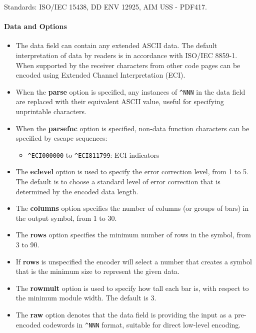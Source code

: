Standards: ISO/IEC 15438, DD ENV 12925, AIM USS - PDF417.

\hypertarget{data-and-options-15}{%
\paragraph{Data and Options}\label{data-and-options-15}}

\begin{itemize}
\tightlist
\item
  The data field can contain any extended ASCII data. The default
  interpretation of data by readers is in accordance with ISO/IEC
  8859-1. When supported by the receiver characters from other code
  pages can be encoded using Extended Channel Interpretation (ECI).
\item
  When the \textbf{parse} option is specified, any instances of
  \texttt{\^{}NNN} in the data field are replaced with their equivalent
  ASCII value, useful for specifying unprintable characters.
\item
  When the \textbf{parsefnc} option is specified, non-data function
  characters can be specified by escape sequences:

  \begin{itemize}
  \tightlist
  \item
    \texttt{\^{}ECI000000} to \texttt{\^{}ECI811799}: ECI indicators
  \end{itemize}
\item
  The \textbf{eclevel} option is used to specify the error correction
  level, from 1 to 5. The default is to choose a standard level of error
  correction that is determined by the encoded data length.
\item
  The \textbf{columns} option specifies the number of columns (or groups
  of bars) in the output symbol, from 1 to 30.
\item
  The \textbf{rows} option specifies the minimum number of rows in the
  symbol, from 3 to 90.
\item
  If \textbf{rows} is unspecified the encoder will select a number that
  creates a symbol that is the minimum size to represent the given data.
\item
  The \textbf{rowmult} option is used to specify how tall each bar is,
  with respect to the minimum module width. The default is 3.
\item
  The \textbf{raw} option denotes that the data field is providing the
  input as a pre-encoded codewords in \texttt{\^{}NNN} format, suitable
  for direct low-level encoding.
\end{itemize}

